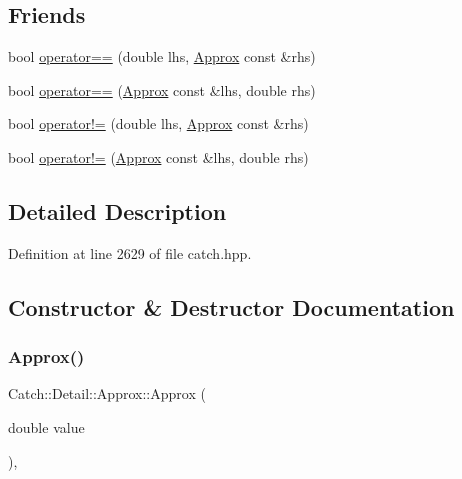 \subsection*{Friends}
\begin{DoxyCompactItemize}
\item 
bool \hyperlink{class_catch_1_1_detail_1_1_approx_ac766f044f1c63f0c5997982baefd9049}{operator==} (double lhs, \hyperlink{class_catch_1_1_detail_1_1_approx}{Approx} const \&rhs)
\item 
bool \hyperlink{class_catch_1_1_detail_1_1_approx_a35999631e6cef569f9da9f3fa910db22}{operator==} (\hyperlink{class_catch_1_1_detail_1_1_approx}{Approx} const \&lhs, double rhs)
\item 
bool \hyperlink{class_catch_1_1_detail_1_1_approx_a83b3763569a7ecc143c335b630be0e47}{operator!=} (double lhs, \hyperlink{class_catch_1_1_detail_1_1_approx}{Approx} const \&rhs)
\item 
bool \hyperlink{class_catch_1_1_detail_1_1_approx_a7497ef839f8026cc0edd6269a80f3e09}{operator!=} (\hyperlink{class_catch_1_1_detail_1_1_approx}{Approx} const \&lhs, double rhs)
\end{DoxyCompactItemize}


\subsection{Detailed Description}


Definition at line 2629 of file catch.\+hpp.



\subsection{Constructor \& Destructor Documentation}
\hypertarget{class_catch_1_1_detail_1_1_approx_a1a8618ea8db08c66bd3d9fe8f74b957a}{}\label{class_catch_1_1_detail_1_1_approx_a1a8618ea8db08c66bd3d9fe8f74b957a} 
\subsubsection{\texorpdfstring{Approx()}{Approx()}\hspace{0.1cm}{\footnotesize\ttfamily [1/2]}}
{\footnotesize\ttfamily Catch\+::\+Detail\+::\+Approx\+::\+Approx (\begin{DoxyParamCaption}\item[{double}]{value }\end{DoxyParamCaption})\hspace{0.3cm}{\ttfamily [inline]}, {\ttfamily [explicit]}}



